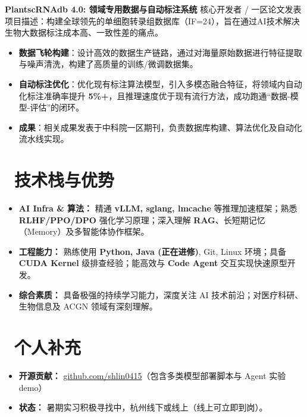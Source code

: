 \documentclass[11pt]{article}
\newlength{\interProjectSpacing}
\newcommand{\projectsep}{\vspace{\interProjectSpacing}}
\newlength{\intraProjectTitleSep}
\newcommand{\titlebreak}{\\[\intraProjectTitleSep]}
\begin{document}
\projectsep

\textbf{PlantscRNAdb 4.0: 领域专用数据与自动标注系统} \hfill 核心开发者 / 一区论文发表 \titlebreak
项目描述：构建全球领先的单细胞转录组数据库（IF=24），旨在通过AI技术解决生物大数据标注成本高、一致性差的痛点。
\begin{itemize}[nosep]
    \item \textbf{数据飞轮构建}：设计高效的数据生产链路，通过对海量原始数据进行特征提取与噪声清洗，构建了高质量的训练/微调数据集。
    \item \textbf{自动标注优化}：优化现有标注算法模型，引入多模态融合特征，将领域内自动化标注准确率提升 \textbf{5\%+}，且推理速度优于现有流行方法，成功跑通“数据-模型-评估”的闭环。
    \item \textbf{成果}：相关成果发表于中科院一区期刊，负责数据库构建、算法优化及自动化流水线实现。
\end{itemize}

\section{\makebox[\widthof{\faCogs}][c]{\color{CVBlue}\faCogs}\ 技术栈与优势}
\begin{itemize}[nosep]
    \item \textbf{AI Infra \& 算法：} 精通 \textbf{vLLM, sglang, lmcache} 等推理加速框架；熟悉 \textbf{RLHF/PPO/DPO} 强化学习原理；深入理解 \textbf{RAG}、长短期记忆（Memory）及多智能体协作框架。
    \item \textbf{工程能力：} 熟练使用 \textbf{Python, Java (正在进修)}, Git, Linux 环境；具备 \textbf{CUDA Kernel} 级排查经验；能高效与 \textbf{Code Agent} 交互实现快速原型开发。
    \item \textbf{综合素质：} 具备极强的持续学习能力，深度关注 AI 技术前沿；对医疗科研、生物信息及 ACGN 领域有深刻理解。
\end{itemize}

\section{\makebox[\widthof{\faInfo}][c]{\color{CVBlue}\faInfo}\ 个人补充}
\begin{itemize}[parsep=0.5ex]
    \item \textbf{开源贡献：} \href{https://github.com/shlin0415}{github.com/shlin0415}（包含多类模型部署脚本与 Agent 实验 demo）
    \item \textbf{状态：} 暑期实习积极寻找中，杭州线下或线上（线上可立即到岗）。
\end{itemize}
\end{document}
